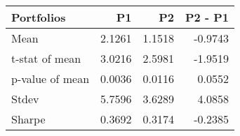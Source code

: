\begin{tabular}{lrrr}
\toprule
Portfolios & P1 & P2 & P2 - P1 \\
\midrule
Mean & 2.1261 & 1.1518 & -0.9743 \\
t-stat of mean & 3.0216 & 2.5981 & -1.9519 \\
p-value of mean & 0.0036 & 0.0116 & 0.0552 \\
Stdev & 5.7596 & 3.6289 & 4.0858 \\
Sharpe & 0.3692 & 0.3174 & -0.2385 \\
\bottomrule
\end{tabular}
